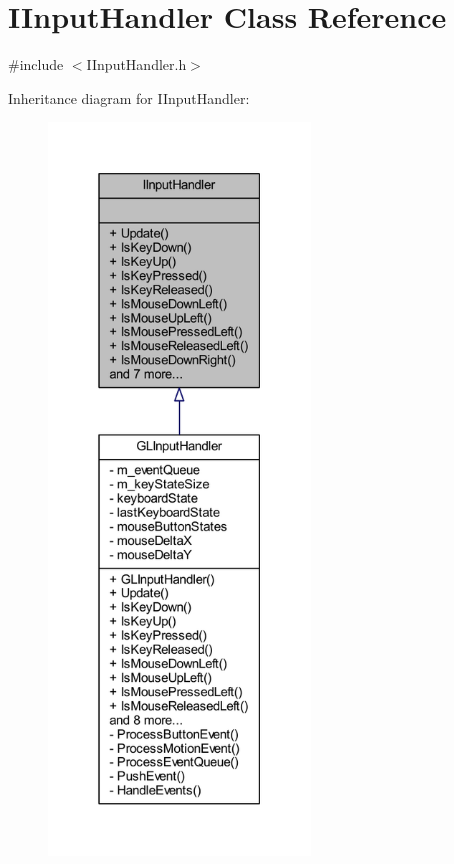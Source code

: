\hypertarget{class_i_input_handler}{}\section{I\+Input\+Handler Class Reference}
\label{class_i_input_handler}


{\ttfamily \#include $<$I\+Input\+Handler.\+h$>$}



Inheritance diagram for I\+Input\+Handler\+:\nopagebreak
\begin{figure}[H]
\begin{center}
\leavevmode
\includegraphics[height=550pt]{class_i_input_handler__inherit__graph}
\end{center}
\end{figure}


